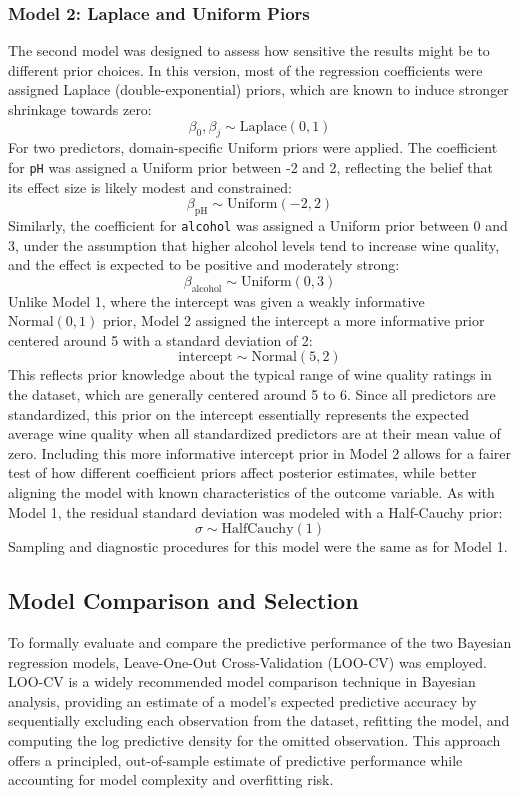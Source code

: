 \documentclass[12pt]{article}
\begin{document}
        \subsubsection{Model 2: Laplace and Uniform Piors}
        The second model was designed to assess how sensitive the results might be to different prior choices. In this version, most of the regression coefficients were assigned Laplace (double-exponential) priors, which are known to induce stronger shrinkage towards zero:
        \[
        \beta_0, \beta_j \sim \text{Laplace}(0, 1)
        \]
        For two predictors, domain-specific Uniform priors were applied. The coefficient for \texttt{pH} was assigned a Uniform prior between -2 and 2, reflecting the belief that its effect size is likely modest and constrained:
        \[
        \beta_{\text{pH}} \sim \text{Uniform}(-2, 2)
        \]
        Similarly, the coefficient for \texttt{alcohol} was assigned a Uniform prior between 0 and 3, under the assumption that higher alcohol levels tend to increase wine quality, and the effect is expected to be positive and moderately strong:
        \[
        \beta_{\text{alcohol}} \sim \text{Uniform}(0, 3)
        \]
        Unlike Model 1, where the intercept was given a weakly informative \(\text{Normal}(0, 1)\) prior, Model 2 assigned the intercept a more informative prior centered around 5 with a standard deviation of 2:
        \[
        \text{intercept} \sim \text{Normal}(5, 2)
        \]
        This reflects prior knowledge about the typical range of wine quality ratings in the dataset, which are generally centered around 5 to 6. Since all predictors are standardized, this prior on the intercept essentially represents the expected average wine quality when all standardized predictors are at their mean value of zero. Including this more informative intercept prior in Model 2 allows for a fairer test of how different coefficient priors affect posterior estimates, while better aligning the model with known characteristics of the outcome variable. As with Model 1, the residual standard deviation was modeled with a Half-Cauchy prior:
        \[
        \sigma \sim \text{HalfCauchy}(1)
        \]
        Sampling and diagnostic procedures for this model were the same as for Model 1.

    \subsection{Model Comparison and Selection}
    To formally evaluate and compare the predictive performance of the two Bayesian regression models, Leave-One-Out Cross-Validation (LOO-CV) was employed. LOO-CV is a widely recommended model comparison technique in Bayesian analysis, providing an estimate of a model’s expected predictive accuracy by sequentially excluding each observation from the dataset, refitting the model, and computing the log predictive density for the omitted observation. This approach offers a principled, out-of-sample estimate of predictive performance while accounting for model complexity and overfitting risk.
\end{document}

